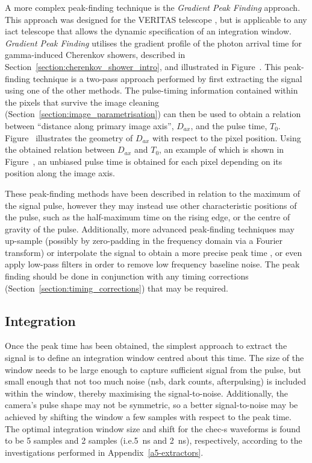  A more complex peak-finding technique is the \textit{Gradient Peak Finding} approach. This approach was designed for the VERITAS telescope \cite{Holder2005}\cite{Cogan2006}\cite{Cogan2007}, but is applicable to any \gls{iact} telescope that allows the dynamic specification of an integration window. \textit{Gradient Peak Finding} utilises the gradient profile of the photon arrival time for gamma-induced Cherenkov showers, described in Section~\ref{section:cherenkov_shower_intro}, and illustrated in Figure~. This peak-finding technique is a two-pass approach performed by first extracting the signal using one of the other methods. The pulse-timing information contained within the pixels that survive the image cleaning (Section~\ref{section:image_parametrisation}) can then be used to obtain a relation between ``distance along primary image axis'', $D_{ax}$, and the pulse time, $T_0$. Figure~ illustrates the geometry of $D_{ax}$ with respect to the pixel position. Using the obtained relation between $D_{ax}$ and $T_0$, an example of which is shown in Figure~, an unbiased pulse time is obtained for each pixel depending on its position along the image axis.

These peak-finding methods have been described in relation to the maximum of the signal pulse, however they may instead use other characteristic positions of the pulse, such as the half-maximum time on the rising edge, or the centre of gravity of the pulse. Additionally, more advanced peak-finding techniques may up-sample (possibly by zero-padding in the frequency domain via a Fourier transform) or interpolate the signal to obtain a more precise peak time \cite{Cogan2006, Cogan2007}, or even apply low-pass filters in order to remove low frequency baseline noise. The peak finding should be done in conjunction with any timing corrections (Section~\ref{section:timing_corrections}) that may be required.

\subsection{Integration}

Once the peak time has been obtained, the simplest approach to extract the signal is to define an integration window centred about this time. The size of the window needs to be large enough to capture sufficient signal from the pulse, but small enough that not too much noise (\gls{nsb}, dark counts, afterpulsing) is included within the window, thereby maximising the signal-to-noise. Additionally, the camera's pulse shape may not be symmetric, so a better signal-to-noise may be achieved by shifting the window a few samples with respect to the peak time. The optimal integration window size and shift for the \gls{chec-s} waveforms is found to be 5 samples and 2 samples (i.e.\@ \SI{5}{ns} and \SI{2}{ns}), respectively, according to the investigations performed in Appendix~\ref{a5-extractors}.

